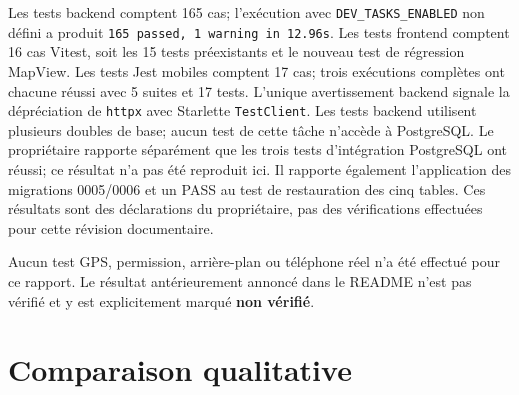 \documentclass[12pt,a4paper]{article}
\begin{document}
Les tests backend comptent 165 cas; l'exécution avec \texttt{DEV\_TASKS\_ENABLED} non défini a produit \texttt{165 passed, 1 warning in 12.96s}. Les tests frontend comptent 16 cas Vitest, soit les 15 tests préexistants et le nouveau test de régression MapView. Les tests Jest mobiles comptent 17 cas; trois exécutions complètes ont chacune réussi avec 5 suites et 17 tests. L'unique avertissement backend signale la dépréciation de \texttt{httpx} avec Starlette \texttt{TestClient}. Les tests backend utilisent plusieurs doubles de base; aucun test de cette tâche n'accède à PostgreSQL. Le propriétaire rapporte séparément que les trois tests d'intégration PostgreSQL ont réussi; ce résultat n'a pas été reproduit ici. Il rapporte également l'application des migrations 0005/0006 et un PASS au test de restauration des cinq tables. Ces résultats sont des déclarations du propriétaire, pas des vérifications effectuées pour cette révision documentaire.

Aucun test GPS, permission, arrière-plan ou téléphone réel n'a été effectué pour ce rapport. Le résultat antérieurement annoncé dans le README n'est pas vérifié et y est explicitement marqué \textbf{non vérifié}.

\section{Comparaison qualitative}
\end{document}
